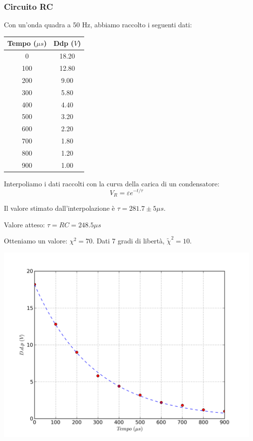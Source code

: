 \subsubsection{Circuito RC}
Con un'onda quadra a 50 Hz, abbiamo raccolto i seguenti dati:
\begin{center}
\begin{tabular}{*{2}{c}}
Tempo ($\mu s$) & Ddp ($V$) \\
\midrule
0 & 18.20 \\
100 & 12.80 \\
200 & 9.00 \\
300 & 5.80 \\
400 & 4.40 \\
500 & 3.20 \\
600 & 2.20 \\
700 & 1.80 \\
800 & 1.20 \\
900 & 1.00 \\
\end{tabular}
\end{center}

Interpoliamo i dati raccolti con la curva della carica di un condensatore: 
$$V_R = \varepsilon e^{-t/\tau}$$


Il valore stimato dall'interpolazione è $\tau=281.7 \pm 5 \mu s$.
	  	
Valore atteso: $\tau=RC=248.5 \mu s$


Otteniamo un valore: $\chi^2 = 70 $. Dati 7 gradi di libertà, $\tilde{\chi}^2 = 10$.

\begin{center}
 \includegraphics[scale=0.70]{grafici/C3/fitcond.png}
\end{center}

